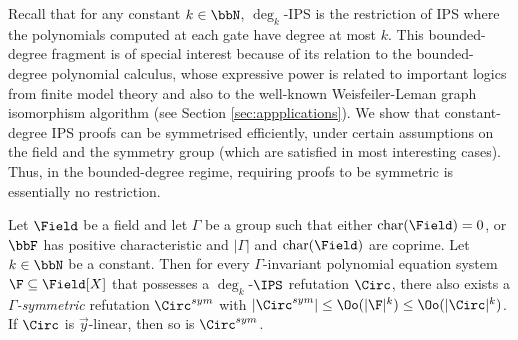 \documentclass[a4paper,UKenglish,cleveref, autoref, thm-restate]{lipics-v2021}
\begin{document}
Recall that for any constant $k \in \bbN$, $\deg_k$-IPS is the restriction of IPS where the polynomials computed at each gate have degree at most $k$. This bounded-degree fragment is of special interest because of its relation to the bounded-degree polynomial calculus, whose expressive power is related to important logics from finite model theory and also to the well-known Weisfeiler-Leman graph isomorphism algorithm (see Section \ref{sec:appplications}).
We show that constant-degree IPS proofs can be symmetrised efficiently, under certain assumptions on the field and the symmetry group (which are satisfied in most interesting cases). Thus, in the bounded-degree regime, requiring proofs to be symmetric is essentially no restriction.

\begin{theorem}
	\label{thm:deg_IPS=deg_sym_IPS}
	Let $\Field$ be a field and let $\Gamma$ be a group
	such that either $\mathrm{char}(\Field) = 0$, or $\bbF$ has positive characteristic and $|\Gamma|$ and $\mathrm{char}(\Field)$ are coprime. Let $k \in \bbN$ be a constant. 
	Then for every $\Gamma$-invariant polynomial equation system $\F \subseteq \Field[X]$ that possesses a $\deg_k$-$\IPS$ refutation $\Circ$, there also exists a \emph{$\Gamma$-symmetric} refutation $\Circ^{sym}$ with $|\Circ^{sym}| \leq \Oo(|\F|^{k}) \leq \Oo(|\Circ|^{k})$.
	If $\Circ$ is $\vec{y}$-linear, then so is $\Circ^{sym}$.
\end{theorem}
\end{document}

